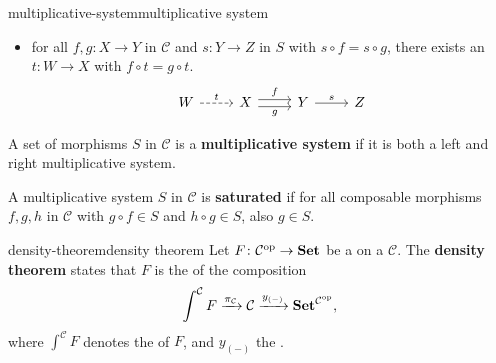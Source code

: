 \begin{topic}{multiplicative-system}{multiplicative system}
\begin{itemize}
        \[ \svg \begin{tikzcd} X \arrow[dashed]{r}{f} \arrow[dashed, swap]{d}{t} & Y \arrow{d}{s} \\ Z \arrow{r}{g} & W \end{tikzcd} \]
        \item for all $f, g \colon X \to Y$ in $\mathcal{C}$ and $s \colon Y \to Z$ in $S$ with $s \circ f = s \circ g$, there exists an $t \colon W \to X$ with $f \circ t = g \circ t$.
        \[ \svg \begin{tikzcd} W \arrow[dashed]{r}{t} & X \arrow[shift left=0.25em]{r}{f} \arrow[swap, shift right=0.25em]{r}{g} & Y \arrow{r}{s} & Z \end{tikzcd} \]
    \end{itemize}
    A set of morphisms $S$ in $\mathcal{C}$ is a \textbf{multiplicative system} if it is both a left and right multiplicative system.
    
    A multiplicative system $S$ in $\mathcal{C}$ is \textbf{saturated} if for all composable morphisms $f, g, h$ in $\mathcal{C}$ with $g \circ f \in S$ and $h \circ g \in S$, also $g \in S$.
\end{topic}

\begin{topic}{density-theorem}{density theorem}
    Let $F \colon \mathcal{C}^\textup{op} \to \textbf{Set}$ be a  on a  $\mathcal{C}$. The \textbf{density theorem} states that $F$ is the  of the composition
    \[ \int^\mathcal{C} F \xrightarrow{\pi_\mathcal{C}} \mathcal{C} \xrightarrow{y_{(-)}} \textbf{Set}^{\mathcal{C}^\textup{op}} , \]
    where $\int^\mathcal{C} F$ denotes the  of $F$, and $y_{(-)}$ the .
\end{topic}


